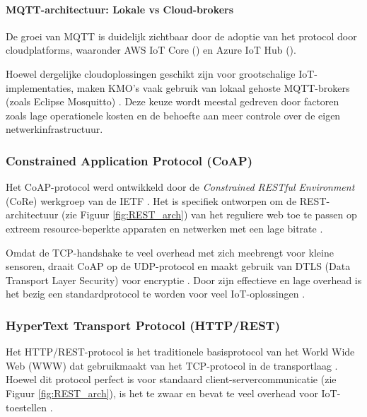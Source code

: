 \paragraph{MQTT-architectuur: Lokale vs Cloud-brokers}
De groei van MQTT is duidelijk zichtbaar door de adoptie van het protocol door cloudplatforms, waaronder AWS IoT Core (\cite{aws_iot_core})  en Azure IoT Hub (\cite{azure_iot_hub}).

Hoewel dergelijke cloudoplossingen geschikt zijn voor grootschalige IoT-implementaties, maken KMO's vaak gebruik van lokaal gehoste MQTT-brokers (zoals Eclipse Mosquitto) . Deze keuze wordt meestal gedreven door factoren zoals lage operationele kosten en de behoefte aan meer controle over de eigen netwerkinfrastructuur.




\subsubsection{Constrained Application Protocol (CoAP)}

Het CoAP-protocol werd ontwikkeld door de \textit{Constrained RESTful Environment} (CoRe) werkgroep van de IETF \autocite{Bay_lm__2022}. Het is specifiek ontworpen om de REST-architectuur (zie Figuur \ref{fig:REST_arch}) van het reguliere web toe te passen op extreem resource-beperkte apparaten en netwerken met een lage bitrate \autocite{aipcp-2591-030074}.


Omdat de TCP-handshake te veel overhead met zich meebrengt voor kleine sensoren, draait CoAP op de UDP-protocol en maakt gebruik van DTLS (Data Transport Layer Security) voor encryptie \autocite{iot-2020-100264}. Door zijn effectieve en lage overhead is het bezig een standardprotocol te worden voor veel IoT-oplossingen \autocite{Thantharate_2019}.



\subsubsection{HyperText Transport Protocol (HTTP/REST)}

Het HTTP/REST-protocol is het traditionele basisprotocol van het World Wide Web (WWW) dat gebruikmaakt van het TCP-protocol in de transportlaag \autocite{iot-2020-100264}. Hoewel dit protocol perfect is voor standaard client-servercommunicatie (zie Figuur \ref{fig:REST_arch}), is het te zwaar en bevat te veel overhead voor IoT-toestellen \autocite{iciss-2020-9316031}.


